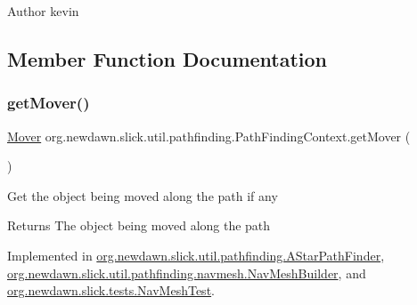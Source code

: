 \begin{DoxyAuthor}{Author}
kevin 
\end{DoxyAuthor}


\subsection{Member Function Documentation}
\mbox{\label{interfaceorg_1_1newdawn_1_1slick_1_1util_1_1pathfinding_1_1_path_finding_context_a50e439d467ccdf457dca18ca60ab367c}} 
\subsubsection{\texorpdfstring{get\+Mover()}{getMover()}}
{\footnotesize\ttfamily \mbox{\hyperlink{interfaceorg_1_1newdawn_1_1slick_1_1util_1_1pathfinding_1_1_mover}{Mover}} org.\+newdawn.\+slick.\+util.\+pathfinding.\+Path\+Finding\+Context.\+get\+Mover (\begin{DoxyParamCaption}{ }\end{DoxyParamCaption})}

Get the object being moved along the path if any

\begin{DoxyReturn}{Returns}
The object being moved along the path 
\end{DoxyReturn}


Implemented in \mbox{\hyperlink{classorg_1_1newdawn_1_1slick_1_1util_1_1pathfinding_1_1_a_star_path_finder_a87eea405304f151bf2ef8621aefe4183}{org.\+newdawn.\+slick.\+util.\+pathfinding.\+A\+Star\+Path\+Finder}}, \mbox{\hyperlink{classorg_1_1newdawn_1_1slick_1_1util_1_1pathfinding_1_1navmesh_1_1_nav_mesh_builder_aa085ed8b240abd28e09687941b65eb1e}{org.\+newdawn.\+slick.\+util.\+pathfinding.\+navmesh.\+Nav\+Mesh\+Builder}}, and \mbox{\hyperlink{classorg_1_1newdawn_1_1slick_1_1tests_1_1_nav_mesh_test_ac645cd0e18a27972590065e165b949f1}{org.\+newdawn.\+slick.\+tests.\+Nav\+Mesh\+Test}}.

\mbox{\label{interfaceorg_1_1newdawn_1_1slick_1_1util_1_1pathfinding_1_1_path_finding_context_af6c873041cbca8ad6edfd63c6e10d243}} 
